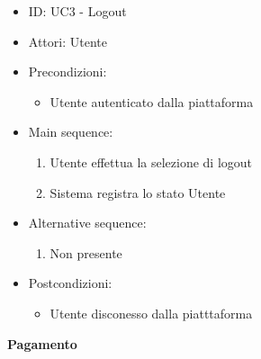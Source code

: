 \documentclass{article}
\begin{document}
\begin{itemize}[label = { }]
    \itemsep0px
    \item ID: UC3 - Logout
    \item Attori: Utente
    \item Precondizioni: 
        \begin{itemize}[label = {-}]
            \item Utente autenticato dalla piattaforma
        \end{itemize}
    \item Main sequence: 
        \begin{enumerate}
            \item Utente effettua la selezione di logout
            \item Sistema registra lo stato Utente
        \end{enumerate}
    \item Alternative sequence:
        \begin{enumerate}
            \item Non presente
        \end{enumerate}
    \item Postcondizioni: 
        \begin{itemize}[label = {-}]
            \item Utente disconesso dalla piatttaforma
        \end{itemize}
\end{itemize}
\textbf{Pagamento}
\end{document}
